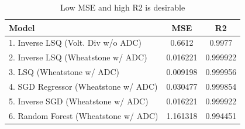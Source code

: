 \begin{table}[H]
    \centering
    \begin{tabularx}{\columnwidth}{|X|c|c|} 
        \hline
        \textbf{Model} & \textbf{MSE} & \textbf{R2} \\
        \hline
        1. Inverse LSQ (Volt. Div w/o ADC) & 0.6612 & 0.9977 \\
        \hline
        2. Inverse LSQ (Wheatstone w/ ADC) & 0.016221 & 0.999922 \\
        \hline
        3. LSQ (Wheatstone w/ ADC) & 0.009198 & 0.999956 \\
        \hline
        4. SGD Regressor (Wheatstone w/ ADC) & 0.030477 & 0.999854 \\
        \hline
        5. Inverse SGD (Wheatstone w/ ADC) & 0.016221 & 0.999922 \\
        \hline
        6. Random Forest (Wheatstone w/ ADC) & 1.161318 & 0.994451 \\
        \hline
    \end{tabularx}
    \caption{Low MSE and high R2 is desirable}
    \label{tab:model_performance}
\end{table}
